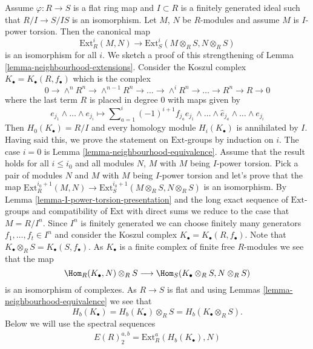 \begin{remark}
\label{remark-neighbourhood-extensions}
Assume $\varphi : R \to S$ is a flat ring map and $I \subset R$ is a
finitely generated ideal such that $R/I \to S/IS$ is an isomorphism.
Let $M$, $N$ be $R$-modules and assume $M$ is $I$-power torsion.
Then the canonical map
$$
\text{Ext}^i_R(M, N)
\longrightarrow
\text{Ext}^i_S(M \otimes_R S, N \otimes_R S)
$$
is an isomorphism for all $i$. We sketch a proof of this strengthening of
Lemma \ref{lemma-neighbourhood-extensions}.
Consider the Koszul complex $K_\bullet = K_\bullet(R, f_\bullet)$ which is
the complex
$$
0 \to \wedge^n R^n \to \wedge^{n-1} R^n \to
\ldots \to \wedge^i R^n \to \ldots \to R^n \to R \to 0
$$
where the last term $R$ is placed in degree $0$ with maps given by
$$
e_{j_1} \wedge \ldots \wedge e_{j_i}
\longmapsto
\sum\nolimits_{a = 1}^i (-1)^{i + 1} f_{j_a} e_{j_1} \wedge \ldots
\wedge \hat e_{j_a} \wedge \ldots \wedge e_{j_i}
$$
Then $H_0(K_\bullet) = R/I$ and every homology module $H_i(K_\bullet)$
is annihilated by $I$. Having said this, we prove the statement
on $\text{Ext}$-groups by induction on $i$. The case $i = 0$ is
Lemma \ref{lemma-neighbourhood-equivalence}.
Assume that the result holds for all $i \leq i_0$ and all modules
$N$, $M$ with $M$ being $I$-power torsion. Pick a pair of modules
$N$ and $M$ with $M$ being $I$-power torsion and let's prove that
the map
$\text{Ext}^{i_0 + 1}_R(M, N) \to
\text{Ext}^{i_0 + 1}_S(M \otimes_R S, N \otimes_R S)$
is an isomorphism. By
Lemma \ref{lemma-I-power-torsion-presentation}
and the long exact sequence of $\text{Ext}$-groups and compatibility of
$\text{Ext}$ with direct sums we reduce to the case that $M = R/I^n$.
Since $I^n$ is finitely generated we can choose finitely many generators
$f_1, \ldots, f_t \in I^n$ and consider the Koszul complex
$K_\bullet = K_\bullet(R, f_\bullet)$. Note that
$K_\bullet \otimes_R S = K_\bullet(S, f_\bullet)$.
As $K_\bullet$ is a finite complex of finite free $R$-modules we
see that the map
\begin{equation}
\label{equation-comparison}
\Hom_R(K_\bullet, N) \otimes_R S
\longrightarrow
\Hom_S(K_\bullet \otimes_R S, N \otimes_R S)
\end{equation}
is an isomorphism of complexes. As $R \to S$ is flat and using
Lemmas \ref{lemma-neighbourhood-equivalence}
we see that
$$
H_b(K_\bullet) = H_b(K_\bullet) \otimes_R S = H_b(K_\bullet \otimes_R S).
$$
Below we will use the spectral sequences
\begin{align*}
E(R)_2^{a, b} = \text{Ext}^a_R(H_b(K_\bullet), N)

\end{align*}
\end{remark}

